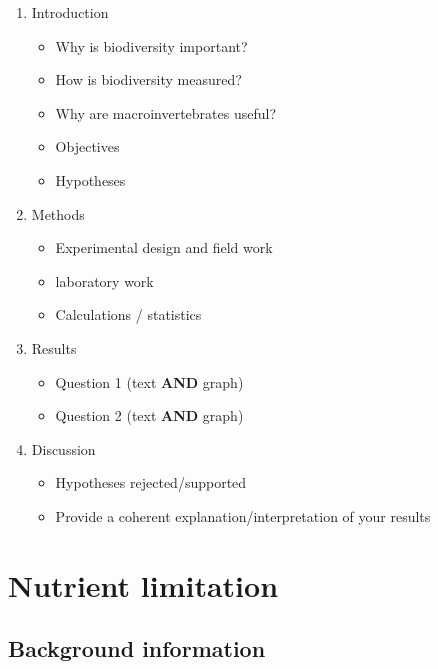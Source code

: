 \documentclass[]{book}
\providecommand{\tightlist}{%
  \setlength{\itemsep}{0pt}\setlength{\parskip}{0pt}}
\begin{document}
\begin{enumerate}
\def\labelenumi{\arabic{enumi}.}
\tightlist
\item
  Introduction

  \begin{itemize}
  \tightlist
  \item
    Why is biodiversity important?
  \item
    How is biodiversity measured?
  \item
    Why are macroinvertebrates useful?
  \item
    Objectives
  \item
    Hypotheses
  \end{itemize}
\item
  Methods

  \begin{itemize}
  \tightlist
  \item
    Experimental design and field work
  \item
    laboratory work
  \item
    Calculations / statistics
  \end{itemize}
\item
  Results

  \begin{itemize}
  \tightlist
  \item
    Question 1 (text \textbf{AND} graph)
  \item
    Question 2 (text \textbf{AND} graph)
  \end{itemize}
\item
  Discussion

  \begin{itemize}
  \tightlist
  \item
    Hypotheses rejected/supported
  \item
    Provide a coherent explanation/interpretation of your results
  \end{itemize}
\end{enumerate}

\hypertarget{nutrient-limitation}{%
\chapter{Nutrient limitation}\label{nutrient-limitation}}

\hypertarget{background-information-4}{%
\section{Background information}\label{background-information-4}}
\end{document}
